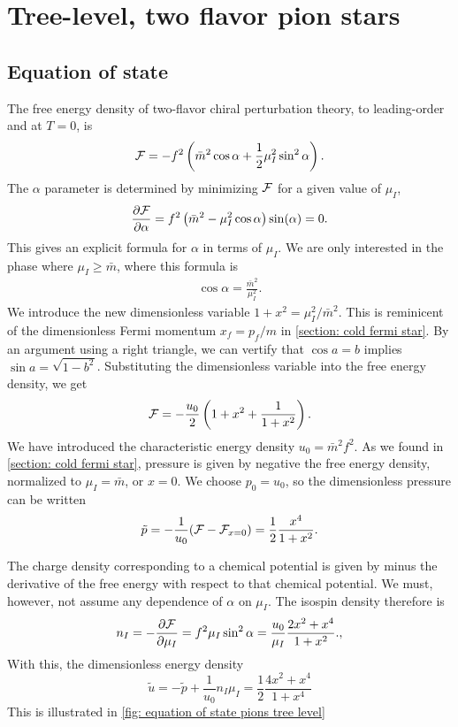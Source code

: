 \section{Tree-level, two flavor pion stars}


\subsection{Equation of state}
The free energy density of two-flavor chiral perturbation theory, to leading-order and at $T = 0$, is
%
\begin{equation}
    \mathcal{F} = - f^2 \left(\bar m^2 \cos \alpha + \frac{1}{2} \mu_I^2 \sin^2 \alpha\right).
\end{equation}
%
The $\alpha$ parameter is determined by minimizing $\mathcal{F}$ for a given value of $\mu_I$,
%
\begin{equation}
    \pdv{\mathcal{F}}{\alpha} = f^2 \left(\bar m^2 - \mu_I^2 \cos \alpha\right) \sin(\alpha) = 0.
\end{equation}
%
This gives an explicit formula for $\alpha$ in terms of $\mu_I$.
We are only interested in the phase where $\mu_I \geq \bar m$, where this formula is
%
\begin{align}
    \label{alpha as function of mu lowest order}
    \cos \alpha = \frac{\bar m^2}{\mu_I^2}.
\end{align}
%
We introduce the new dimensionless variable $1 + x^2 = \mu_I^2 / \bar m^2$.
This is reminicent of the dimensionless Fermi momentum $x_f = p_f / m$ in \autoref{section: cold fermi star}. 
By an argument using a right triangle, we can vertify that $\cos a = b$ implies $\sin a = \sqrt{1 - b^2}$.
Substituting the dimensionless variable into the free energy density, we get
%
\begin{equation}
    \mathcal{F} = - \frac{u_0}{2}\left(1 + x^2 +\frac{1}{1 + x^2}\right).
\end{equation}
%
We have introduced the characteristic energy density $u_0 = \bar m^2 f^2$.
As we found in \autoref{section: cold fermi star}, pressure is given by negative the free energy density, normalized to $\mu_I = \bar m$, or $x = 0$.
We choose $p_0 = u_0$, so the dimensionless pressure can be written
%
\begin{equation}
    \tilde p = -\frac{1}{u_0}(\mathcal{F} - \mathcal{F}_{x = 0}) 
    = \frac{1}{2} \frac{x^4}{1 + x^2}.
\end{equation}
%

The charge density corresponding to a chemical potential is given by minus the derivative of the free energy with respect to that chemical potential.
We must, however, not assume any dependence of $\alpha$ on $\mu_I$.
The isospin density therefore is
%
\begin{equation}
    n_I = -\pdv{\mathcal{F}}{\mu_I} = f^2 \mu_I \sin^2 \alpha
    = \frac{u_0}{\mu_I} \frac{2x^2 + x^4}{1 + x^2}.
    ,
\end{equation}
%
With this, the dimensionless energy density
%
\begin{equation}
    \tilde u = -\tilde p + \frac{1}{u_0} n_I \mu_I
    = \frac{1}{2} \frac{4x^2 + x^4}{1 + x^4}
\end{equation}
%
This is illustrated in \autoref{fig: equation of state pions tree level}

